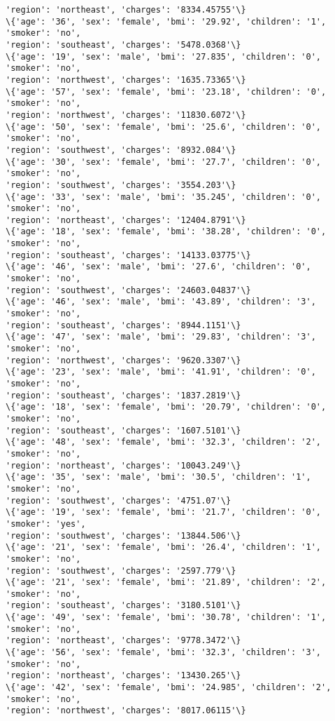 \documentclass[11pt]{article}
\begin{document}
\begin{Verbatim}[commandchars=\\\{\}]
'region': 'northeast', 'charges': '8334.45755'\}
\{'age': '36', 'sex': 'female', 'bmi': '29.92', 'children': '1', 'smoker': 'no',
'region': 'southeast', 'charges': '5478.0368'\}
\{'age': '19', 'sex': 'male', 'bmi': '27.835', 'children': '0', 'smoker': 'no',
'region': 'northwest', 'charges': '1635.73365'\}
\{'age': '57', 'sex': 'female', 'bmi': '23.18', 'children': '0', 'smoker': 'no',
'region': 'northwest', 'charges': '11830.6072'\}
\{'age': '50', 'sex': 'female', 'bmi': '25.6', 'children': '0', 'smoker': 'no',
'region': 'southwest', 'charges': '8932.084'\}
\{'age': '30', 'sex': 'female', 'bmi': '27.7', 'children': '0', 'smoker': 'no',
'region': 'southwest', 'charges': '3554.203'\}
\{'age': '33', 'sex': 'male', 'bmi': '35.245', 'children': '0', 'smoker': 'no',
'region': 'northeast', 'charges': '12404.8791'\}
\{'age': '18', 'sex': 'female', 'bmi': '38.28', 'children': '0', 'smoker': 'no',
'region': 'southeast', 'charges': '14133.03775'\}
\{'age': '46', 'sex': 'male', 'bmi': '27.6', 'children': '0', 'smoker': 'no',
'region': 'southwest', 'charges': '24603.04837'\}
\{'age': '46', 'sex': 'male', 'bmi': '43.89', 'children': '3', 'smoker': 'no',
'region': 'southeast', 'charges': '8944.1151'\}
\{'age': '47', 'sex': 'male', 'bmi': '29.83', 'children': '3', 'smoker': 'no',
'region': 'northwest', 'charges': '9620.3307'\}
\{'age': '23', 'sex': 'male', 'bmi': '41.91', 'children': '0', 'smoker': 'no',
'region': 'southeast', 'charges': '1837.2819'\}
\{'age': '18', 'sex': 'female', 'bmi': '20.79', 'children': '0', 'smoker': 'no',
'region': 'southeast', 'charges': '1607.5101'\}
\{'age': '48', 'sex': 'female', 'bmi': '32.3', 'children': '2', 'smoker': 'no',
'region': 'northeast', 'charges': '10043.249'\}
\{'age': '35', 'sex': 'male', 'bmi': '30.5', 'children': '1', 'smoker': 'no',
'region': 'southwest', 'charges': '4751.07'\}
\{'age': '19', 'sex': 'female', 'bmi': '21.7', 'children': '0', 'smoker': 'yes',
'region': 'southwest', 'charges': '13844.506'\}
\{'age': '21', 'sex': 'female', 'bmi': '26.4', 'children': '1', 'smoker': 'no',
'region': 'southwest', 'charges': '2597.779'\}
\{'age': '21', 'sex': 'female', 'bmi': '21.89', 'children': '2', 'smoker': 'no',
'region': 'southeast', 'charges': '3180.5101'\}
\{'age': '49', 'sex': 'female', 'bmi': '30.78', 'children': '1', 'smoker': 'no',
'region': 'northeast', 'charges': '9778.3472'\}
\{'age': '56', 'sex': 'female', 'bmi': '32.3', 'children': '3', 'smoker': 'no',
'region': 'northeast', 'charges': '13430.265'\}
\{'age': '42', 'sex': 'female', 'bmi': '24.985', 'children': '2', 'smoker': 'no',
'region': 'northwest', 'charges': '8017.06115'\}

\end{Verbatim}
\end{document}
